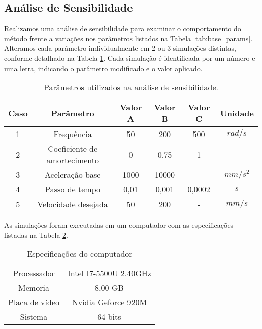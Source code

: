 \subsection{Análise de Sensibilidade}

Realizamos uma análise de sensibilidade para examinar o comportamento do método frente a variações nos parâmetros listados na Tabela \ref{tab:base_params}. Alteramos cada parâmetro individualmente em 2 ou 3 simulações distintas, conforme detalhado na Tabela \ref{tab:sim_params}. Cada simulação é identificada por um número e uma letra, indicando o parâmetro modificado e o valor aplicado.

\begin{table}
    \begin{center}
    \caption{Parâmetros utilizados na análise de sensibilidade.}
    \label{tab:sim_params}
    \begin{tabular}{c c c c c c}
        Caso & Parâmetro & Valor A & Valor B & Valor C & Unidade\\ \hline
        1 & Frequência & 50 & 200 & 500 & $rad/s$\\
        2 & Coeficiente de amortecimento & 0 & 0,75 & 1 & - \\
        3 & Aceleração base & 1000 & 10000 & - & $mm/s^2$ \\
        4 & Passo de tempo & 0,01 & 0,001 & 0,0002 & $s$ \\
        5 & Velocidade desejada & 50 & 200 & - & $mm/s$ \\ \hline
    \end{tabular}
    \end{center}
\end{table}

As simulações foram executadas em um computador com as especificações listadas na Tabela \ref{tab:note_config}.

\begin{table}
    \begin{center}
    \caption{Especificações do computador}
    \label{tab:note_config}
    \begin{tabular}{c c}
        \hline
        Processador & Intel I7-5500U 2.40GHz \\
        Memoria & 8,00 GB \\
        Placa de vídeo & Nvidia Geforce 920M \\
        Sistema & 64 bits \\ \hline
    \end{tabular}
    \end{center}
\end{table}
